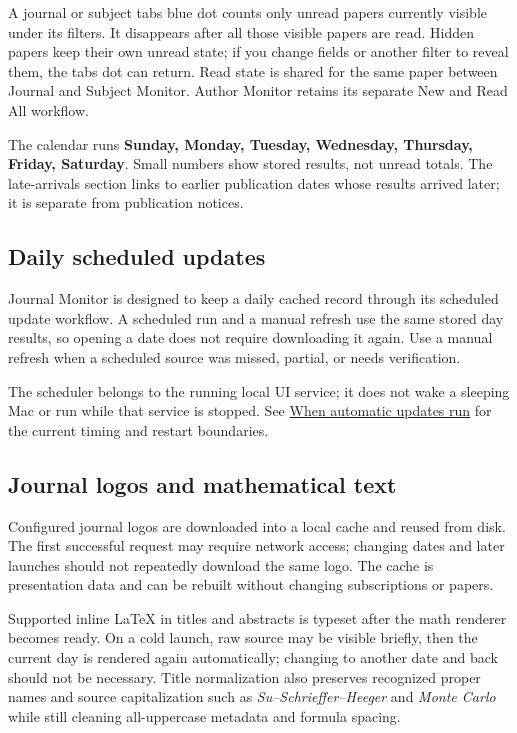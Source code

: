\documentclass[10pt,letterpaper,oneside]{scrreprt}
\begin{document}
A journal or subject tab\textquotesingle s blue dot counts only unread papers currently visible under its filters. It disappears after all those visible papers are read. Hidden papers keep their own unread state; if you change fields or another filter to reveal them, the tab\textquotesingle s dot can return. Read state is shared for the same paper between Journal and Subject Monitor. Author Monitor retains its separate New and Read All workflow.

The calendar runs \textbf{Sunday, Monday, Tuesday, Wednesday, Thursday, Friday, Saturday}. Small numbers show stored results, not unread totals. The late-arrivals section links to earlier publication dates whose results arrived later; it is separate from publication notices.

\subsection{Daily scheduled updates}\label{daily-scheduled-updates}

Journal Monitor is designed to keep a daily cached record through its scheduled update workflow. A scheduled run and a manual refresh use the same stored day results, so opening a date does not require downloading it again. Use a manual refresh when a scheduled source was missed, partial, or needs verification.

The scheduler belongs to the running local UI service; it does not wake a sleeping Mac or run while that service is stopped. See \hyperref[startup]{When automatic updates run} for the current timing and restart boundaries.

\subsection{Journal logos and mathematical text}\label{journal-logos-and-mathematical-text}

Configured journal logos are downloaded into a local cache and reused from disk. The first successful request may require network access; changing dates and later launches should not repeatedly download the same logo. The cache is presentation data and can be rebuilt without changing subscriptions or papers.

Supported inline LaTeX in titles and abstracts is typeset after the math renderer becomes ready. On a cold launch, raw source may be visible briefly, then the current day is rendered again automatically; changing to another date and back should not be necessary. Title normalization also preserves recognized proper names and source capitalization such as \emph{Su--Schrieffer--Heeger} and \emph{Monte Carlo} while still cleaning all-uppercase metadata and formula spacing.
\end{document}
